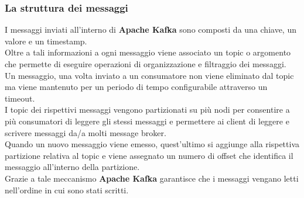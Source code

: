 \subsubsection{La struttura dei messaggi}
I messaggi inviati all'interno di \textbf{Apache Kafka} sono composti da una chiave, un valore e un timestamp. \\
Oltre a tali informazioni a ogni messaggio viene associato un \gls{topic}{} o argomento che permette di eseguire operazioni di organizzazione 
e filtraggio dei messaggi.\\
Un messaggio, una volta inviato a un consumatore non viene eliminato dal \gls{topic}{} ma viene mantenuto per un periodo di tempo configurabile attraverso un timeout.\\
I \gls{topic}{} dei rispettivi messaggi vengono partizionati su più nodi per consentire a più consumatori di leggere gli stessi messaggi e permettere ai client di leggere e scrivere messaggi da/a molti \gls{message broker}{}.\\
Quando un nuovo messaggio viene emesso, quest'ultimo si aggiunge alla rispettiva partizione relativa al \gls{topic}{} e viene assegnato un numero di offset che identifica il messaggio all'interno della partizione.\\
Grazie a tale meccanismo \textbf{Apache Kafka} garantisce che i messaggi vengano letti nell'ordine in cui sono stati scritti.
